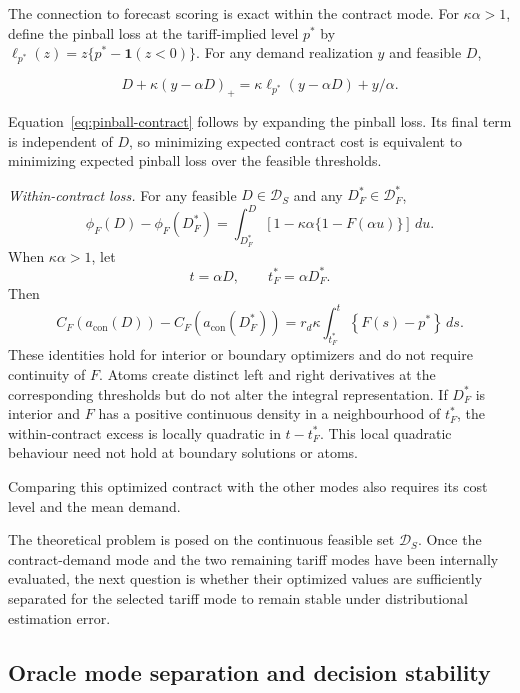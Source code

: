 \documentclass[Times1COL]{WileyNJDv5}
\begin{document}
The connection to forecast scoring is exact within the contract mode.
For $\kappa\alpha>1$, define the pinball loss at the tariff-implied
level $p^\ast$ by
$\ell_{p^\ast}(z)=z\{p^\ast-\mathbf{1}(z<0)\}$. For any demand
realization $y$ and feasible $D$,

\begin{equation}
\label{eq:pinball-contract}
D+\kappa(y-\alpha D)_+
=
\kappa\ell_{p^\ast}(y-\alpha D)+y/\alpha.
\end{equation}

Equation~\eqref{eq:pinball-contract} follows by expanding the pinball
loss. Its final term is independent of $D$, so minimizing expected
contract cost is equivalent to minimizing expected pinball loss over
the feasible thresholds.

\noindent\textit{Within-contract loss.}
For any feasible $D\in\mathcal{D}_S$ and any
$D_F^\ast\in\mathcal{D}_F^\ast$,
\[
\phi_F(D)-\phi_F(D_F^\ast)
=
\int_{D_F^\ast}^{D}
\left[
1-\kappa\alpha\{1-F(\alpha u)\}
\right]\,du.
\]
When $\kappa\alpha>1$, let
\[
t=\alpha D,
\qquad
t_F^\ast=\alpha D_F^\ast.
\]
Then
\begin{equation}
\label{eq:within-contract-loss}
C_F\!\left(a_{\mathrm{con}}(D)\right)
-
C_F\!\left(a_{\mathrm{con}}(D_F^\ast)\right)
=
r_d\kappa
\int_{t_F^\ast}^{t}
\left\{F(s)-p^\ast\right\}\,ds.
\end{equation}
These identities hold for interior or boundary optimizers and do not
require continuity of $F$. Atoms create distinct left and right
derivatives at the corresponding thresholds but do not alter the
integral representation. If $D_F^\ast$ is interior and $F$ has a
positive continuous density in a neighbourhood of $t_F^\ast$, the
within-contract excess is locally quadratic in $t-t_F^\ast$. This
local quadratic behaviour need not hold at boundary solutions or
atoms.

Comparing this optimized contract with the other modes also requires its cost level and the mean demand.

The theoretical problem is posed on the continuous feasible set $\mathcal{D}_S$. Once the contract-demand mode and the two remaining tariff modes have been internally evaluated, the next question is whether their optimized values are sufficiently separated for the selected tariff mode to remain stable under distributional estimation error.

\subsection{Oracle mode separation and decision stability}
\label{sec:mode-separation}
\end{document}
